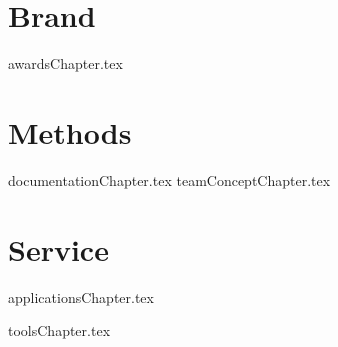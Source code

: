 \documentclass[openany]{book}  %
\title{}  %
\begin{document}
\frontmatter %

\maketitle %

\tableofcontents %
	
\mainmatter %


\part{Brand} %
{awardsChapter.tex}	
	
\part{Methods}
{documentationChapter.tex}	
{teamConceptChapter.tex}
			
\part{Service}

{applicationsChapter.tex}

{toolsChapter.tex}


%

\end{document}
